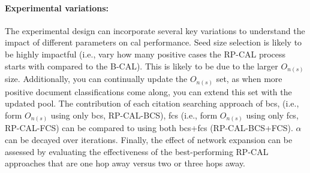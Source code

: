 \documentclass[10pt,oneside]{book}
\begin{document}
\paragraph{Experimental variations:}
The experimental design can incorporate several key variations to understand the impact of different parameters on \gls*{cal} performance. Seed size selection is likely to be highly impactful (i.e., vary how many positive cases the RP-CAL process starts with compared to the B-CAL). This is likely to be due to the larger $O_{n{(s)}}$ size. Additionally, you can continually update the $O_{n{(s)}}$ set, as when more positive document classifications come along, you can extend this set with the updated pool. The contribution of each citation searching approach of \gls*{bcs}, (i.e., form $O_{n{(s)}}$ using only \gls*{bcs}, RP-CAL-BCS), \gls*{fcs} (i.e., form $O_{n{(s)}}$ using only \gls*{fcs}, RP-CAL-FCS) can be compared to using both \gls*{bcs}+\gls*{fcs} (RP-CAL-BCS+FCS). $\alpha$ can be decayed over iterations. Finally, the effect of network expansion can be assessed by evaluating the effectiveness of the best-performing RP-CAL approaches that are one hop away versus two or three hops away.  
\end{document}
